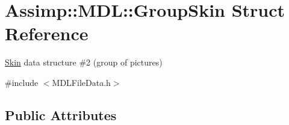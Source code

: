 \hypertarget{struct_assimp_1_1_m_d_l_1_1_group_skin}{\section{Assimp\+:\+:M\+D\+L\+:\+:Group\+Skin Struct Reference}
\label{struct_assimp_1_1_m_d_l_1_1_group_skin}
}


\hyperlink{struct_assimp_1_1_m_d_l_1_1_skin}{Skin} data structure \#2 (group of pictures)  




{\ttfamily \#include $<$M\+D\+L\+File\+Data.\+h$>$}

\subsection*{Public Attributes}
